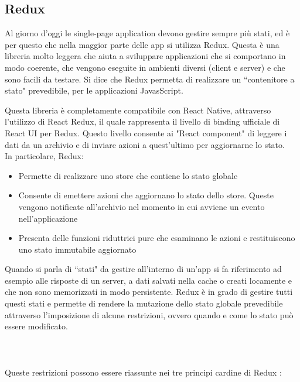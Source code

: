 \subsection{Redux}

Al giorno d'oggi le single-page application devono gestire sempre pi\`u stati, ed \`e per questo che nella maggior parte delle app
si utilizza Redux. Questa \`e una libreria molto leggera che aiuta a sviluppare applicazioni che si comportano in modo coerente, che vengono eseguite in
ambienti diversi (client e server) e che sono facili da testare. Si dice che Redux permetta di realizzare un ``contenitore a stato" prevedibile, per le applicazioni JavasScript.

Questa libreria \`e completamente compatibile con React Native, attraverso l'utilizzo di React Redux, il quale rappresenta il livello di binding ufficiale di React UI per Redux.
Questo livello consente ai "React component" di leggere i dati da un archivio e di inviare azioni a quest'ultimo per aggiornarne lo stato.\\
In particolare, Redux:
\begin{itemize}
      \item Permette di realizzare uno store che contiene lo stato globale
      \item Consente di emettere azioni che aggiornano lo stato dello store. Queste vengono notificate all'archivio nel momento in cui avviene un evento nell'applicazione
      \item Presenta delle funzioni riduttrici pure che esaminano le azioni e restituiscono uno stato immutabile aggiornato
\end{itemize}
Quando si parla di ``stati" da gestire all'interno di un'app si fa riferimento ad esempio alle risposte di un server, a dati salvati nella
cache o creati locamente e che non sono memorizzati in modo persistente. Redux \`e in grado di gestire tutti questi stati e permette di rendere la mutazione
dello stato globale prevedibile attraverso l'imposizione di alcune restrizioni, ovvero quando e come lo stato pu\`o essere modificato.\\ \\ \\ \\

Queste restrizioni possono essere riassunte nei tre principi cardine di Redux \cite{Redux}:

